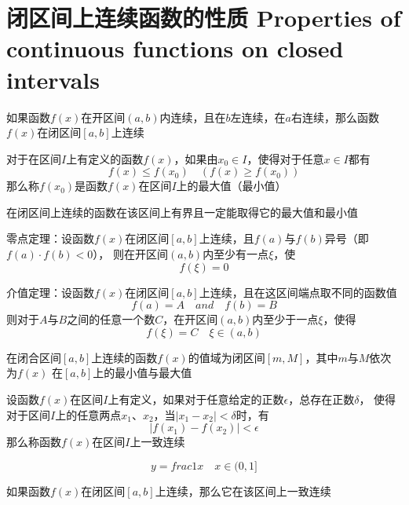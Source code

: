 \documentclass[UTF8]{ctexart}
\begin{document}
\section*{闭区间上连续函数的性质 Properties of continuous functions on closed intervals}

\bigskip

如果函数$f(x)$在开区间$(a,b)$内连续，且在$b$左连续，在$a$右连续，那么函数$f(x)$在闭区间$[a,b]$上连续

\bigskip

对于在区间$I$上有定义的函数$f(x)$，如果由$x_0\in I$，使得对于任意$x\in I$都有
\[ f(x)\le f(x_0)\quad(f(x)\ge f(x_0)) \]
那么称$f(x_0)$是函数$f(x)$在区间$I$上的最大值（最小值）

\bigskip

在闭区间上连续的函数在该区间上有界且一定能取得它的最大值和最小值

\bigskip

零点定理：设函数$f(x)$在闭区间$[a,b]$上连续，且$f(a)$与$f(b)$异号（即$f(a)\cdot f(b)<0$），
则在开区间$(a,b)$内至少有一点$\xi$，使
\[f(\xi)=0\]

\bigskip

介值定理：设函数$f(x)$在闭区间$[a,b]$上连续，且在这区间端点取不同的函数值
\[ f(a)=A \quad and \quad f(b)=B \]
则对于$A$与$B$之间的任意一个数$C$，在开区间$(a,b)$内至少于一点$\xi$，使得
\[ f(\xi)=C\quad\xi\in(a,b) \]

\bigskip

在闭合区间$[a,b]$上连续的函数$f(x)$的值域为闭区间$[m,M]$，其中$m$与$M$依次为$f(x)$
在$[a,b]$上的最小值与最大值

\bigskip

\bigskip

设函数$f(x)$在区间$I$上有定义，如果对于任意给定的正数$\epsilon$，总存在正数$\delta$，
使得对于区间$I$上的任意两点$x_1$、$x_2$，当$|x_1-x_2|<\delta$时，有
\[ |f(x_1)-f(x_2)|<\epsilon \]
那么称函数$f(x)$在区间$I$上一致连续

\bigskip
\[y=frac{1}{x}\quad x\in(0,1]\]
\bigskip

如果函数$f(x)$在闭区间$[a,b]$上连续，那么它在该区间上一致连续
\end{document}

